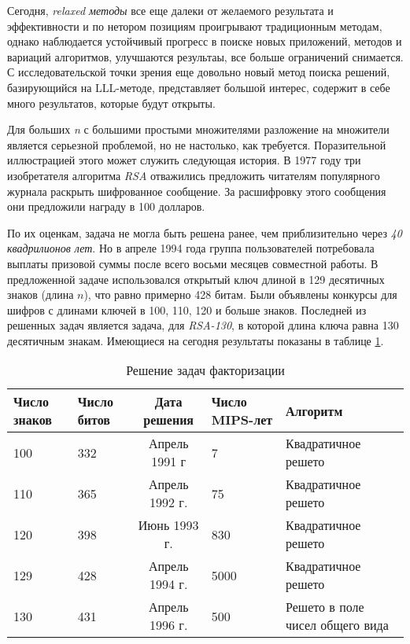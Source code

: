   Сегодня, \textit{relaxed методы} все еще далеки от желаемого результата и эффективности и по нетором позициям проигрывают традиционным методам,
  однако наблюдается устойчивый прогресс в поиске новых приложений, методов и вариаций алгоритмов, улучшаются результаы, все больше ограничений
  снимается. С исследовательской точки зрения еще довольно новый метод поиска решений, базирующийся на LLL-методе, представляет большой интерес,
  содержит в себе много результатов, которые будут открыты.
  
  Для больших \textit{n} с большими простыми множителями разложение на множители является серьезной проблемой, но не настолько, как требуется. 
  Поразительной иллюстрацией этого может служить следующая история. В 1977 году три изобретателя алгоритма
\textit{RSA} отважились предложить читателям 
  популярного журнала раскрыть шифрованное сообщение. За расшифровку этого сообщения они предложили
награду в 100 долларов.
  
  По их оценкам, задача не могла быть решена ранее, чем приблизительно через \textit{40 квадрилионов лет}. Но в апреле 1994 года группа пользователей 
потребовала выплаты призовой суммы после всего восьми месяцев совместной работы. В предложенной задаче использовался открытый ключ длиной в
129 десятичных знаков (длина $n$), что равно примерно 428 битам. Были объявлены конкурсы для шифров с длинами ключей в 100, 110, 120
и больше знаков. Последней из решенных задач является задача, для \textit{RSA-130}, в которой длина ключа 
равна 130 десятичным знакам. Имеющиеся на сегодня результаты показаны в таблице \ref{table-prime-attacks}.

\begin{table}[ht]
    \centering
    \begin{tabular}{@{}p{2.5cm}p{2.5cm}cp{2.5cm}p{4.5cm}@{}}
    \toprule
    \textbf{Число знаков} & \textbf{Число битов} & \textbf{Дата решения} & \textbf{Число MIPS-лет} & \textbf{Алгоритм} \\ \midrule
    100                              & 332                  & Апрель 1991 г         & 7                       & Квадратичное решето              \\
    110                              & 365                  & Апрель 1992 г.        & 75                      & Квадратичное решето              \\
    120                              & 398                  & Июнь 1993 г.          & 830                     & Квадратичное решето              \\
    129                              & 428                  & Апрель 1994 г.        & 5000                    & Квадратичное решето              \\
    130                              & 431                  & Апрель 1996 г.        & 500                     & Решето в поле чисел общего вида  \\ 
    \bottomrule
    \end{tabular}
    \caption{Решение задач факторизации}
    \label{table-prime-attacks}
  \end{table}

